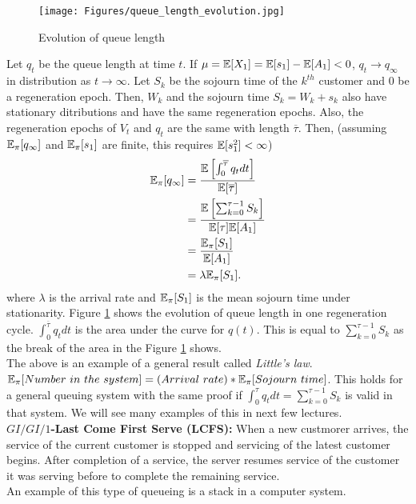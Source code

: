 \documentclass[all-lectures.tex]{subfiles}
\begin{document}
\begin{figure}
\centering
\texttt{[image: Figures/queue\_length\_evolution.jpg]}
\caption{Evolution of queue length}
\label{fig_queue_length_evolution}
\end{figure}
Let $q_t$ be the queue length at time $t$. If $\mu = \mathbb{E}[X_1] = \mathbb{E}[s_1] - \mathbb{E}[A_1] < 0$, $q_t \to q_\infty$ in distribution as $t \to \infty$. Let $S_k$ be the sojourn time of the $k^{th}$ customer and $0$ be a regeneration epoch. Then, $W_k$ and the sojourn time $S_k = W_k + s_k$ also have stationary ditributions and have the same regeneration epochs. Also, the regeneration epochs of $V_t$ and $q_t$ are the same with length $\overline{\tau}$. Then, (assuming $\mathbb{E}_\pi[q_\infty]$ and $\mathbb{E}_\pi[s_1]$ are finite, this requires $\mathbb{E}[s_1^2] < \infty$)
\begin{align*}
\mathbb{E}_{\pi}[q_\infty] &= \frac{\mathbb{E}\left[ \int_0^{\overline{\tau}} q_t dt\right]}{\mathbb{E}[\overline{\tau}]} \\
&= \frac{\mathbb{E}\left[ \sum_{k=0}^{\tau-1} S_k \right]}{\mathbb{E}[\tau]\mathbb{E}[A_1]} \\
&= \frac{ \mathbb{E}_{\pi}[S_1] }{\mathbb{E}[A_1]} \\
&= \lambda \mathbb{E}_{\pi}[S_1].
\end{align*}
where $\lambda$ is the arrival rate and $\mathbb{E}_{\pi}[ S_1]$ is the mean sojourn time under stationarity. Figure \ref{fig_queue_length_evolution} shows the evolution of queue length in one regeneration cycle. $\int_0^{\overline{\tau}} q_t dt$ is the area under the curve for $q(t)$. This is equal to  $\sum_{k=0}^{\tau-1} S_k $ as the break of the area in the Figure \ref{fig_queue_length_evolution} shows.\\
\indent The above is an example of a general result called \textit{Little's law}. 
$\mathbb{E}_{\pi}[Number\ in\ the\ system] = (Arrival\ rate) * \mathbb{E}_{\pi}[Sojourn \ time]$. This holds for a general queuing system with the same proof if $\int_0^\tau q_t dt = \sum_{k=0}^{\tau -1} S_k$ is valid in that system. We will see many examples of this in next few lectures.\\

\indent \textbf{$GI/GI/1$-Last Come First Serve (LCFS):} When a new custmorer arrives, the service of the current customer is stopped and servicing of the latest customer begins. After completion of a service, the server resumes service of the customer it was serving before to complete the remaining service. \\
\indent An example of this type of queueing is a stack in a computer system.
\end{document}
